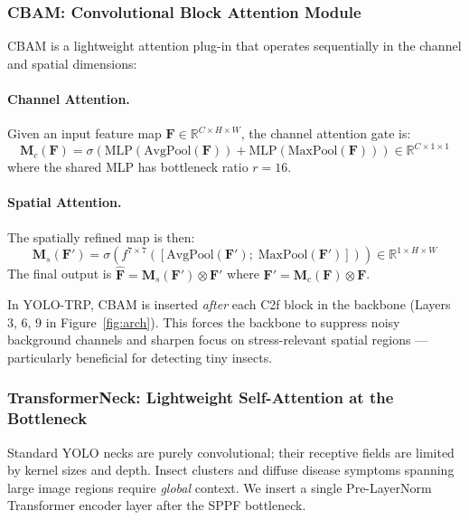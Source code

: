 \documentclass[12pt, a4paper]{article}
\begin{document}
\subsubsection{CBAM: Convolutional Block Attention Module}
\label{sec:cbam}

CBAM \cite{woo2018cbam} is a lightweight attention plug-in that operates sequentially in the channel and spatial dimensions:

\paragraph{Channel Attention.}
Given an input feature map $\mathbf{F} \in \mathbb{R}^{C \times H \times W}$, the channel attention gate is:
\[
  \mathbf{M}_c(\mathbf{F}) = \sigma\!\left(\text{MLP}\!\left(\text{AvgPool}(\mathbf{F})\right) + \text{MLP}\!\left(\text{MaxPool}(\mathbf{F})\right)\right) \in \mathbb{R}^{C \times 1 \times 1}
\]
where the shared MLP has bottleneck ratio $r = 16$.

\paragraph{Spatial Attention.}
The spatially refined map is then:
\[
  \mathbf{M}_s(\mathbf{F}') = \sigma\!\left(f^{7\times7}\!\left(\left[\text{AvgPool}(\mathbf{F}');\;\text{MaxPool}(\mathbf{F}')\right]\right)\right) \in \mathbb{R}^{1 \times H \times W}
\]
The final output is $\hat{\mathbf{F}} = \mathbf{M}_s(\mathbf{F}') \otimes \mathbf{F}'$ where $\mathbf{F}' = \mathbf{M}_c(\mathbf{F}) \otimes \mathbf{F}$.

In YOLO-TRP, CBAM is inserted \emph{after} each C2f block in the backbone (Layers 3, 6, 9 in Figure~\ref{fig:arch}). This forces the backbone to suppress noisy background channels and sharpen focus on stress-relevant spatial regions — particularly beneficial for detecting tiny insects.

\subsubsection{TransformerNeck: Lightweight Self-Attention at the Bottleneck}
\label{sec:transformer}

Standard YOLO necks are purely convolutional; their receptive fields are limited by kernel sizes and depth. Insect clusters and diffuse disease symptoms spanning large image regions require \emph{global} context. We insert a single Pre-LayerNorm Transformer encoder layer \cite{vaswani2017attention} after the SPPF bottleneck.
\end{document}
